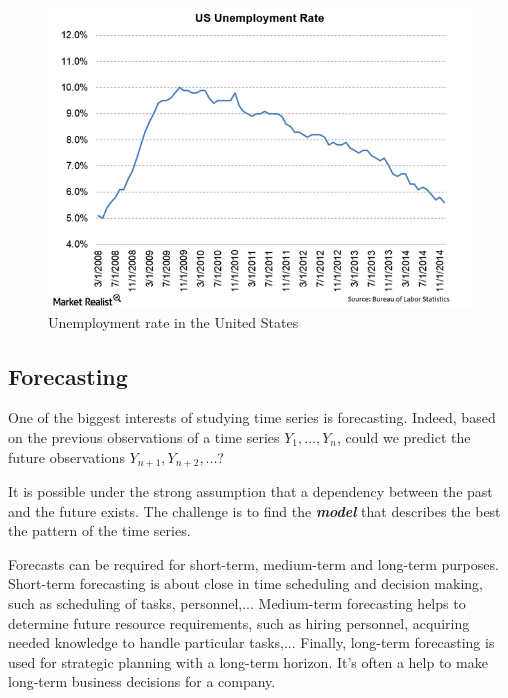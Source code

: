 \documentclass[11pt,a4paper,oneside]{book}
\begin{document}
\begin{figure}[ht]
  \centering
    \includegraphics[scale=0.5]{img/Unemployment-Rate.png}
  \caption{Unemployment rate in the United States}
  \label{fig:US}
\end{figure}



\subsection{Forecasting}

One of the biggest interests of studying time series is forecasting. Indeed, based on the previous observations of a time series $Y_{1},...,Y_{n}$, could we predict the future observations  $Y_{n+1}, Y_{n+2},...$? 

It is possible under the strong assumption that a dependency between the past and the future exists. The challenge is to find the \textit{\textbf{model}} that describes the best the pattern of the time series.

Forecasts can be required for short-term, medium-term and long-term purposes. Short-term forecasting is about close in time scheduling and decision making, such as scheduling of tasks, personnel,... Medium-term forecasting helps to determine future resource requirements, such as hiring personnel, acquiring needed knowledge to handle particular tasks,... Finally, long-term forecasting is used for strategic planning with a long-term horizon. It's often a help to make long-term business decisions for a company. \cite{hyndman}
\end{document}
